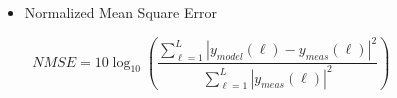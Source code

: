 \documentclass[aspectratio=169]{beamer}
\begin{document}
\begin{frame}
\begin{columns}[t]
\begin{column}{0.6\textwidth}
\begin{itemize}
       \begin{itemize}
             \item Normalized Mean Square Error
       \end{itemize}
     \end{itemize}
     \begin{equation}
          NMSE = 10 \log_{10} \left ( \frac{ \sum_{\ell=1}^{L} \left | y_{model}(\ell) - y_{meas}(\ell) \right |^2 }{\sum_{\ell=1}^{L}  \left | y_{meas}(\ell) \right |^2 }  \right )
    \end{equation}
    \end{column}
    \begin{column}{0.05\textwidth}
      
    \end{column}
  \end{columns}



\end{frame}
\end{document}
